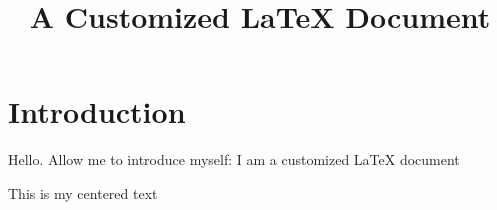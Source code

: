 \documentclass[24pt,titlepage,letterpaper]{report}
\begin{document}
\title{A Customized LaTeX Document}

\section{Introduction}

Hello. Allow me to introduce myself: I am a customized LaTeX document

\begin{center}This is my centered text\par
\end{center}
\end{document}
